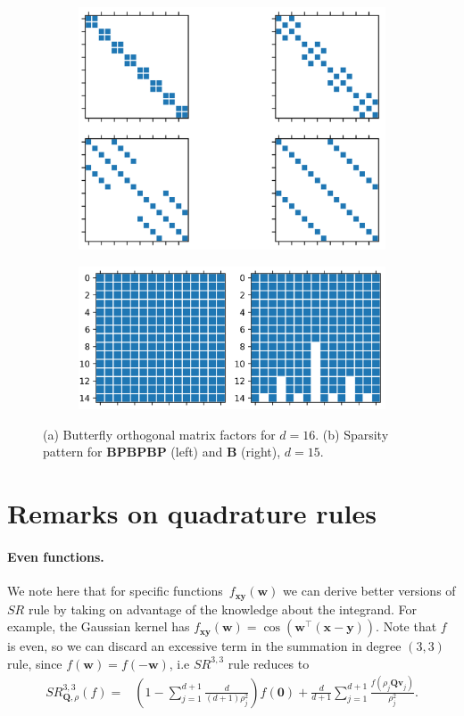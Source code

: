 \begin{figure}[t]
\begin{subfigure}[t]{.5\textwidth}
\centering
\includegraphics[width=0.575\linewidth]{figures/quadratures/b16.png}
\caption{}
\label{fig:factors}
\end{subfigure}
\hfill
\begin{subfigure}[t]{.5\textwidth}
\centering
\includegraphics[width=\linewidth]{figures/quadratures/rvsr.png}
\caption{}
\label{fig:sparsity}
\end{subfigure}
\caption{(a) Butterfly orthogonal matrix factors for ${d = 16}$. (b) Sparsity pattern for $\mathbf{BPBPBP}$ (left) and $\mathbf{B}$ (right), $d=15$.}
\end{figure}


\section{Remarks on quadrature rules}
\paragraph*{Even functions.}
We note here that for specific functions~$f_{\mathbf{xy}}(\mathbf{w})$ we can derive better versions of $SR$ rule by taking on advantage of the knowledge about the integrand.
For example, the Gaussian kernel has ${f_{\mathbf{xy}}(\mathbf{w}) =
\cos(\mathbf{w}^{\boldsymbol{\top}}(\mathbf{x} - \mathbf{y}))}$.
Note that $f$ is even, so we can discard an excessive term in the summation in degree $(3, 3)$ rule, since $f(\mathbf{w}) = f(-\mathbf{w})$, i.e $SR^{3,3}$ rule reduces to
\begin{equation}
\begin{split}
\label{eq:sr33reduced}
SR^{3,3}_{\mathbf{Q}, \rho}(f) = &\left (1 - \sum_{j=1}^{d + 1}\frac{d}{(d + 1)\rho_j^2} \right )f(\mathbf{0}) + \frac{d}{d+1}\sum\limits_{j=1}^{d+1} \frac{f(\rho_j \mathbf{Qv}_j)}{\rho_j^2}.
\end{split}
\end{equation}

